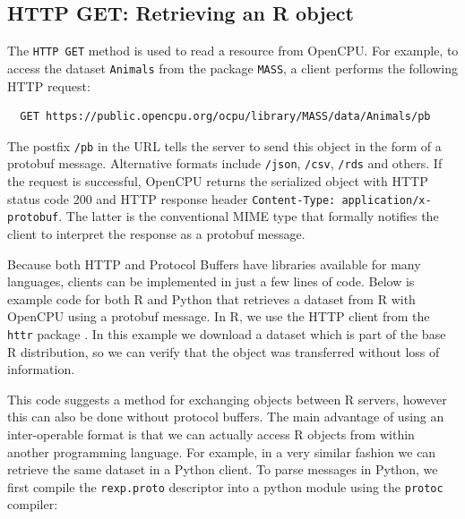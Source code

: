 \documentclass[article]{jss}
\begin{document}
\subsection{HTTP GET: Retrieving an R object}

The \texttt{HTTP GET} method is used to read a resource from OpenCPU. For example,
to access the dataset \texttt{Animals} from the package \texttt{MASS}, a 
client performs the following HTTP request:

\begin{verbatim}
  GET https://public.opencpu.org/ocpu/library/MASS/data/Animals/pb
\end{verbatim}
The postfix \texttt{/pb} in the URL tells the server to send this
object in the form of a protobuf message. Alternative formats include 
\texttt{/json}, \texttt{/csv}, \texttt{/rds} and others. If the request
is successful, OpenCPU returns the serialized object with HTTP status 
code 200 and HTTP response header \texttt{Content-Type: application/x-protobuf}. 
The latter is the conventional MIME type that formally notifies the client to
interpret the response as a protobuf message. 

Because both HTTP and Protocol Buffers have libraries available for many 
languages, clients can be implemented in just a few lines of code. Below
is example code for both R and Python that retrieves a dataset from R with 
OpenCPU using a protobuf message. In R, we use the HTTP client from 
the \texttt{httr} package \citep{httr}.
In this example we
download a dataset which is part of the base R distribution, so we can
verify that the object was transferred without loss of information.

\begin{Schunk}
\end{Schunk}
This code suggests a method for exchanging objects between R servers, however this can 
also be done without protocol buffers. The main advantage of using an inter-operable format 
is that we can actually access R objects from within another
programming language. For example, in a very similar fashion we can retrieve the same
dataset in a Python client. To parse messages in Python, we first compile the 
\texttt{rexp.proto} descriptor into a python module using the \texttt{protoc} compiler:
\end{document}
